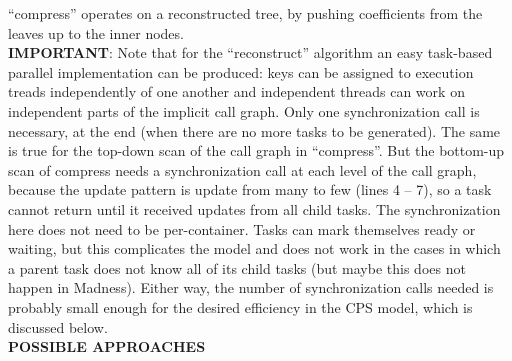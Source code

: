 \documentclass{article}
\begin{document}
``compress'' operates on a reconstructed tree, by pushing
coefficients from the leaves up to the inner nodes.\\

{\bf IMPORTANT}: Note that for the ``reconstruct'' algorithm an easy
task-based parallel implementation can be produced: keys can be assigned to
execution treads independently of one another and independent threads can work
on independent parts of the implicit call graph. Only one synchronization call
is necessary, at the end (when there are no more tasks to be generated). The
same is true for the top-down scan of the call graph in ``compress''. But the
bottom-up scan of compress needs a synchronization call at each level of the
call graph, because the update pattern is update from many to few (lines 4 --
7), so a task cannot return until it received updates from all child tasks. The
synchronization here does not need to be per-container. Tasks can mark
themselves ready or waiting, but this complicates the model and does not work
in the cases in which a parent task does not know all of its child tasks (but
maybe this does not happen in Madness). Either way, the number of
synchronization calls needed is probably small enough for the desired
efficiency in the CPS model, which is discussed below.\\

{\bf POSSIBLE APPROACHES} 
\end{document}
